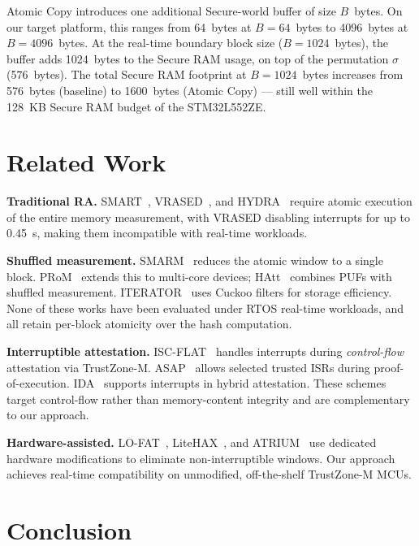 \documentclass[conference]{IEEEtran}
\begin{document}
Atomic Copy introduces one additional Secure-world buffer of size
$B$~bytes. On our target platform, this ranges from 64~bytes at
$B = 64$~bytes to 4096~bytes at $B = 4096$~bytes. At the real-time
boundary block size ($B = 1024$~bytes), the buffer adds 1024~bytes
to the Secure RAM usage, on top of the permutation $\sigma$
(576~bytes). The total Secure RAM footprint at $B = 1024$~bytes
increases from 576~bytes (baseline) to 1600~bytes (Atomic Copy) —
still well within the 128~KB Secure RAM budget of the STM32L552ZE.

\section{Related Work}
\label{sec:related}
 
\textbf{Traditional RA.} SMART~\cite{eldefrawy2012smart},
VRASED~\cite{nunes2019vrased}, and HYDRA~\cite{eldefrawy2017hydra}
require atomic execution of the entire memory measurement, with
VRASED disabling interrupts for up to 0.45~s, making them
incompatible with real-time workloads.
 
\textbf{Shuffled measurement.}
SMARM~\cite{carpent2018smarm} reduces the atomic window to a
single block. PRoM~\cite{aman2021prom} extends this to multi-core
devices; HAtt~\cite{aman2018hatt} combines PUFs with shuffled
measurement. ITERATOR~\cite{sponziello2025iterator} uses Cuckoo
filters for storage efficiency. None of these works have been
evaluated under RTOS real-time workloads, and all retain per-block
atomicity over the hash computation.
 
\textbf{Interruptible attestation.}
ISC-FLAT~\cite{isc-flat} handles interrupts during \emph{control-flow}
attestation via TrustZone-M. ASAP~\cite{asap} allows selected
trusted ISRs during proof-of-execution. IDA~\cite{ida2024} supports
interrupts in hybrid attestation. These schemes target control-flow
rather than memory-content integrity and are complementary to our
approach.
 
\textbf{Hardware-assisted.}
LO-FAT~\cite{lo-fat}, LiteHAX~\cite{litehax}, and
ATRIUM~\cite{atrium} use dedicated hardware modifications to
eliminate non-interruptible windows. Our approach achieves
real-time compatibility on unmodified, off-the-shelf TrustZone-M
MCUs.
 
\section{Conclusion}
\label{sec:conclusion}
 
\end{document}
